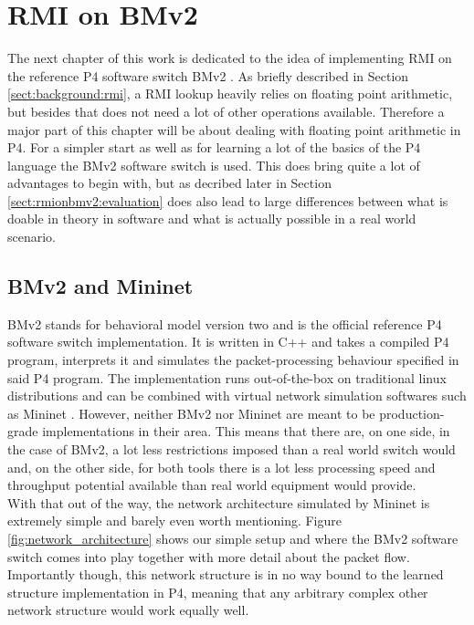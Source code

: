 
\chapter{RMI on BMv2}
\label{ch:rmionbmv2}
The next chapter of this work is dedicated to the idea of implementing RMI on the reference P4 software switch BMv2 \cite{bmv2}. As briefly described in Section \ref{sect:background:rmi}, a RMI lookup heavily relies on floating point arithmetic, but besides that does not need a lot of other operations available. Therefore a major part of this chapter will be about dealing with floating point arithmetic in P4. For a simpler start as well as for learning a lot of the basics of the P4 language the BMv2 software switch is used. This does bring quite a lot of advantages to begin with, but as decribed later in Section \ref{sect:rmionbmv2:evaluation} does also lead to large differences between what is doable in theory in software and what is actually possible in a real world scenario.

\section{BMv2 and Mininet}
BMv2 \cite{bmv2} stands for behavioral model version two and is the official reference P4 software switch implementation. It is written in C++ and takes a compiled P4 program,  interprets it and simulates the packet-processing behaviour specified in said P4 program. The implementation runs out-of-the-box on traditional linux distributions and can be combined with virtual network simulation softwares such as Mininet \cite{mininet}. However, neither BMv2 nor Mininet are meant to be production-grade implementations in their area. This means that there are, on one side, in the case of BMv2, a lot less restrictions imposed than a real world switch would and, on the other side, for both tools there is a lot less processing speed and throughput potential available than real world equipment would provide.\\

With that out of the way, the network architecture simulated by Mininet is extremely simple and barely even worth mentioning. Figure \ref{fig:network_architecture} shows our simple setup and where the BMv2 software switch comes into play together with more detail about the packet flow. Importantly though, this network structure is in no way bound to the learned structure implementation in P4, meaning that any arbitrary complex other network structure would work equally well.

